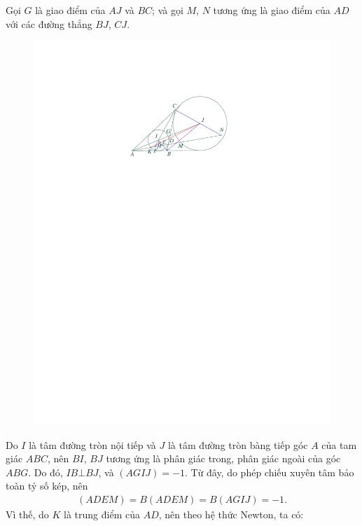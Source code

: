\begin{multicols}{2}
	\vskip 0.05cm
	Gọi $G$ là giao điểm của $AJ$ và $BC$; và gọi $M$, $N$ tương ứng là giao điểm của $AD$ với các đường thẳng $BJ$, $CJ$.
	\begin{figure}[H]
		\vspace*{-20pt}
		\centering
		\captionsetup{labelformat= empty, justification=centering}
		\includegraphics[width= 0.98\linewidth]{P738}
		\vspace*{-20pt}
	\end{figure}
	Do $I$ là tâm đường tròn nội tiếp và $J$  là tâm đường tròn bàng tiếp góc $A$ của tam giác $ABC$, nên $BI$, $BJ$ tương ứng là phân giác trong, phân giác ngoài của góc $ABG$. Do đó, $IB \bot BJ$, và  $\left( {AGIJ} \right) =  - 1.$ Từ đây, do phép chiếu xuyên tâm bảo toàn tỷ số kép, nên
	\begin{align*}
		(ADEM) = B(ADEM) = B(AGIJ)= -1.
	\end{align*}
	Vì thế, do $K$ là trung điểm của $AD$, nên theo hệ thức Newton, ta có:
	\begin{align*}

\end{align*}
\end{multicols}

